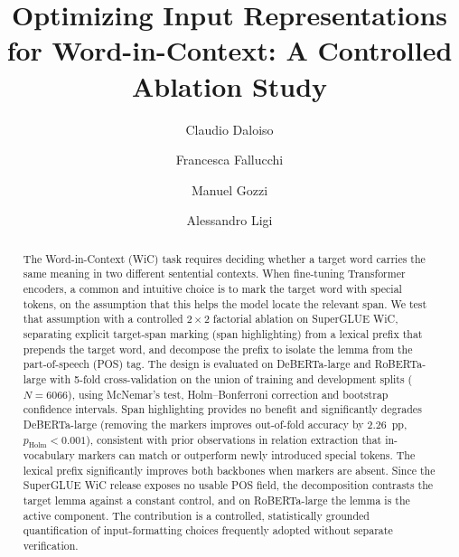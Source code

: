 \documentclass[runningheads]{llncs}
\begin{document}
\title{Optimizing Input Representations for Word-in-Context:
A Controlled Ablation Study}


\author{Claudio Daloiso \and
Francesca Fallucchi \and
Manuel Gozzi \and
Alessandro Ligi}



\maketitle

\begin{abstract}
The Word-in-Context (WiC) task requires deciding whether a target word carries
the same meaning in two different sentential contexts. When fine-tuning
Transformer encoders, a common and intuitive choice is to mark the target word
with special tokens, on the assumption that this helps the model locate the
relevant span. We test that assumption with a controlled $2 \times 2$ factorial
ablation on SuperGLUE WiC, separating explicit target-span marking (span
highlighting) from a lexical prefix that prepends the target word, and decompose
the prefix to isolate the lemma from the part-of-speech (POS) tag. The design is
evaluated on DeBERTa-large and RoBERTa-large with 5-fold cross-validation on the
union of training and development splits ($N = 6066$), using McNemar's test,
Holm--Bonferroni correction and bootstrap confidence intervals. Span
highlighting provides no benefit and significantly degrades DeBERTa-large
(removing the markers improves out-of-fold accuracy by $2.26$~pp,
$p_{\text{Holm}} < 0.001$), consistent with prior observations in relation
extraction that in-vocabulary markers can match or outperform newly introduced
special tokens. The lexical prefix significantly improves both backbones when
markers are absent. Since the SuperGLUE WiC release exposes no usable POS field,
the decomposition contrasts the target lemma against a constant control, and on
RoBERTa-large the lemma is the active component. The contribution is a
controlled, statistically grounded quantification of input-formatting choices
frequently adopted without separate verification.

\end{abstract}
\end{document}
